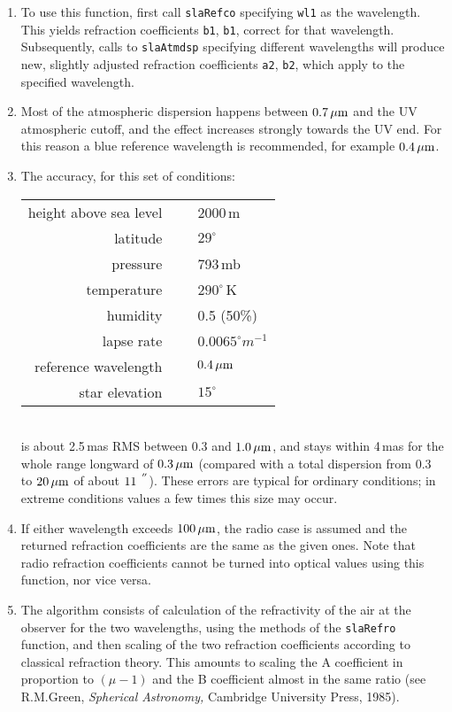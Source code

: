 \documentclass[11pt,fleqn,twoside]{article}
\renewcommand{\_}{{\tt\char'137}}     %
\newcommand{\arcseci}[1] {$#1\hspace{0.05em}$\raisebox{-0.5ex}
                         {$^{'\hspace{-0.1em}'\hspace{0.0em}}$}}
\begin{document}
{
 \begin{enumerate}
  \item To use this function, first call {\tt slaRefco} specifying {\tt wl1} as the
        wavelength.  This yields refraction coefficients
        {\tt b1}, {\tt b1}, correct
        for that wavelength.  Subsequently, calls to {\tt slaAtmdsp} specifying
        different wavelengths will produce new, slightly adjusted
        refraction coefficients {\tt a2}, {\tt b2},
        which apply to the specified wavelength.
  \item Most of the atmospheric dispersion happens between $0.7\,\mu{\rm m}$
        and the UV atmospheric cutoff, and the effect increases strongly
        towards the UV end.  For this reason a blue reference wavelength
        is recommended, for example $0.4\,\mu{\rm m}$.
  \item The accuracy, for this set of conditions: \\[1pc]
   \hspace*{5ex} \begin{tabular}{rcl}
        height above sea level & ~ & 2000\,m \\
                      latitude & ~ & $29^\circ$ \\
                      pressure & ~ & 793\,mb \\
                   temperature & ~ & $290^\circ$\,K \\
                      humidity & ~ & 0.5 (50\%) \\
                    lapse rate & ~ & $0.0065^\circ m^{-1}$ \\
          reference wavelength & ~ & $0.4\,\mu{\rm m}$ \\
                star elevation & ~ & $15^\circ$ \\
                  \end{tabular}\\[1pc]
        is about 2.5\,mas RMS between 0.3 and $1.0\,\mu{\rm m}$, and stays
        within 4\,mas for the whole range longward of $0.3\,\mu{\rm m}$
        (compared with a total dispersion from 0.3 to $20\,\mu{\rm m}$
        of about \arcseci{11}).  These errors are typical for ordinary
        conditions;  in extreme conditions values a few times this size
        may occur.
  \item If either wavelength exceeds $100\,\mu{\rm m}$, the radio case
        is assumed and the returned refraction coefficients are the
        same as the given ones. Note that radio refraction coefficients
        cannot be turned into optical values using this function, nor
        vice versa.
  \item The algorithm consists of calculation of the refractivity of the
        air at the observer for the two wavelengths, using the methods
        of the {\tt slaRefro} function, and then scaling of the two refraction
        coefficients according to classical refraction theory.  This
        amounts to scaling the A coefficient in proportion to $(\mu-1)$ and
        the B coefficient almost in the same ratio (see R.M.Green,
        {\it Spherical Astronomy,}\/ Cambridge University Press, 1985).
 \end{enumerate}
}
\end{document}

